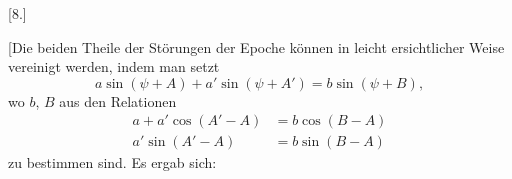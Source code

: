 \begingroup
{}
\renewcommand{\headrulewidth}{0pt}
\par\medskip
{}
\begin{center}[8.]\end{center}
\par\noindent\hspace*{\parindent}[Die beiden Theile der Störungen der Epoche können in leicht ersichtlicher Weise vereinigt werden, indem man setzt
\[
a\sin(\psi+A)+a'\sin(\psi+A')=b\sin(\psi+B),
\]
wo \(b\), \(B\) aus den Relationen
\[
\begin{aligned}
a+a'\cos(A'-A)&=b\cos(B-A)\\
a'\sin(A'-A)&=b\sin(B-A)
\end{aligned}
\]
zu bestimmen sind. Es ergab sich:
\par
{}
\begingroup\small
